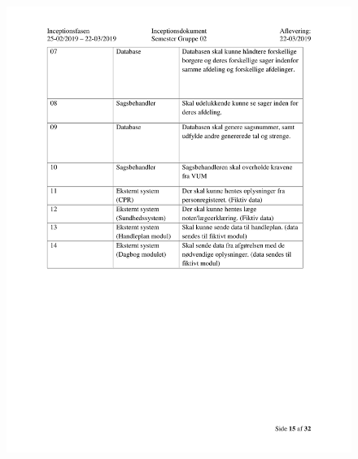\begin{figure}[hb]
  \includegraphics[scale = 0.33]{./PNG/Inceptions/Gruppe 02 + InceptionsDokument-16.jpg} 
\end{figure}

